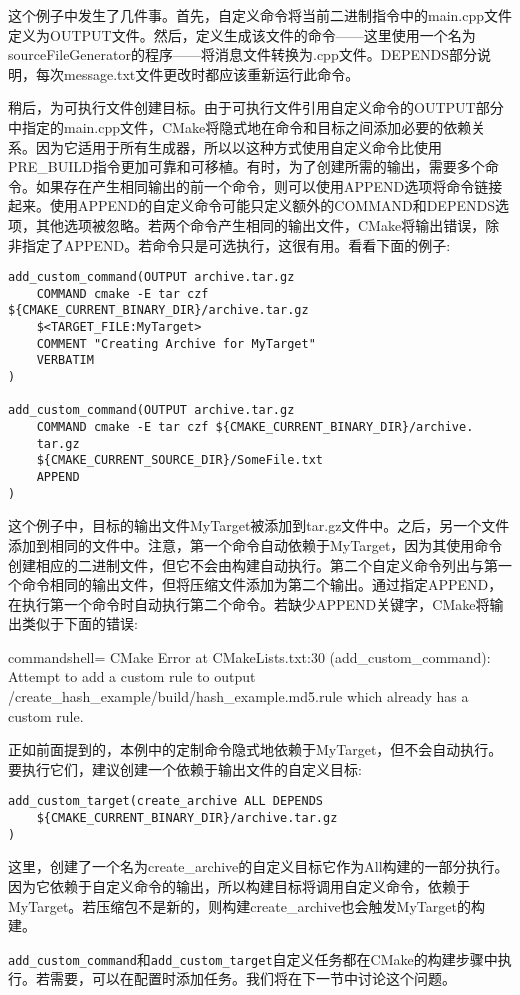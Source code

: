 这个例子中发生了几件事。首先，自定义命令将当前二进制指令中的main.cpp文件定义为OUTPUT文件。然后，定义生成该文件的命令——这里使用一个名为sourceFileGenerator的程序——将消息文件转换为.cpp文件。DEPENDS部分说明，每次message.txt文件更改时都应该重新运行此命令。

稍后，为可执行文件创建目标。由于可执行文件引用自定义命令的OUTPUT部分中指定的main.cpp文件，CMake将隐式地在命令和目标之间添加必要的依赖关系。因为它适用于所有生成器，所以以这种方式使用自定义命令比使用PRE\_BUILD指令更加可靠和可移植。有时，为了创建所需的输出，需要多个命令。如果存在产生相同输出的前一个命令，则可以使用APPEND选项将命令链接起来。使用APPEND的自定义命令可能只定义额外的COMMAND和DEPENDS选项，其他选项被忽略。若两个命令产生相同的输出文件，CMake将输出错误，除非指定了APPEND。若命令只是可选执行，这很有用。看看下面的例子:

\begin{lstlisting}[style=styleCMake]
add_custom_command(OUTPUT archive.tar.gz
	COMMAND cmake -E tar czf ${CMAKE_CURRENT_BINARY_DIR}/archive.tar.gz
	$<TARGET_FILE:MyTarget>
	COMMENT "Creating Archive for MyTarget"
	VERBATIM
)

add_custom_command(OUTPUT archive.tar.gz
	COMMAND cmake -E tar czf ${CMAKE_CURRENT_BINARY_DIR}/archive.
	tar.gz
	${CMAKE_CURRENT_SOURCE_DIR}/SomeFile.txt
	APPEND
)
\end{lstlisting}

这个例子中，目标的输出文件MyTarget被添加到tar.gz文件中。之后，另一个文件添加到相同的文件中。注意，第一个命令自动依赖于MyTarget，因为其使用命令创建相应的二进制文件，但它不会由构建自动执行。第二个自定义命令列出与第一个命令相同的输出文件，但将压缩文件添加为第二个输出。通过指定APPEND，在执行第一个命令时自动执行第二个命令。若缺少APPEND关键字，CMake将输出类似于下面的错误:

\begin{tcblisting}{commandshell={}}
CMake Error at CMakeLists.txt:30 (add_custom_command):
  Attempt to add a custom rule to output
    /create_hash_example/build/hash_example.md5.rule
  which already has a custom rule.
\end{tcblisting}

正如前面提到的，本例中的定制命令隐式地依赖于MyTarget，但不会自动执行。要执行它们，建议创建一个依赖于输出文件的自定义目标:

\begin{lstlisting}[style=styleCMake]
add_custom_target(create_archive ALL DEPENDS
	${CMAKE_CURRENT_BINARY_DIR}/archive.tar.gz
)
\end{lstlisting}

这里，创建了一个名为create\_archive的自定义目标它作为All构建的一部分执行。因为它依赖于自定义命令的输出，所以构建目标将调用自定义命令，依赖于MyTarget。若压缩包不是新的，则构建create\_archive也会触发MyTarget的构建。

\texttt{add\_custom\_command}和\texttt{add\_custom\_target}自定义任务都在CMake的构建步骤中执行。若需要，可以在配置时添加任务。我们将在下一节中讨论这个问题。

